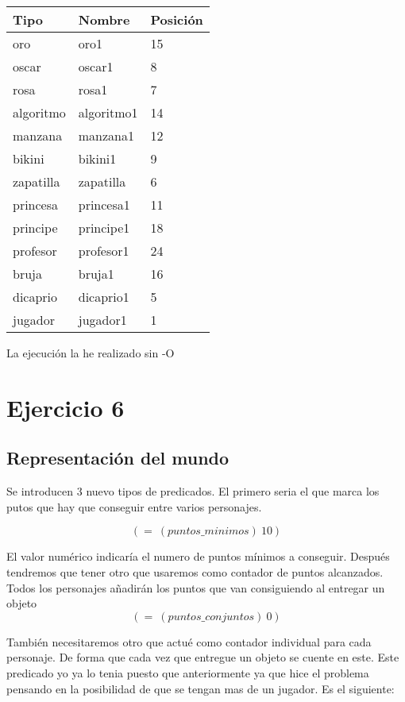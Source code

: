 \documentclass[]{article}
\begin{document}
\begin{table}[H]
	\begin{center}
		\begin{tabular}{|l|l|l|}
			\hline
			Tipo & Nombre & Posición \\
			\hline \hline
			oro & oro1 & 15 \\ \hline
			oscar & oscar1 & 8\\ \hline
			rosa & rosa1 & 7\\ \hline
			algoritmo & algoritmo1 & 14 \\ \hline
			manzana & manzana1 & 12\\ \hline
			bikini & bikini1 & 9\\ \hline
			zapatilla & zapatilla & 6\\ \hline 
			princesa & princesa1 & 11 \\ \hline
			principe & principe1 & 18 \\ \hline
			profesor & profesor1 & 24  \\ \hline
			bruja & bruja1 & 16 \\ \hline
			dicaprio  & dicaprio1& 5 \\ \hline
			jugador & jugador1 & 1 \\ \hline
			
		\end{tabular}
	\end{center}
\end{table}

La ejecución la he realizado sin -O
	\section{Ejercicio 6}
	\subsection{Representación del mundo}
	Se introducen 3 nuevo tipos de predicados. El primero seria el que marca los putos que hay que conseguir entre varios personajes.
	
	$$
	(=\ (puntos\_minimos)\ 10)
	$$
	
	El valor numérico indicaría el numero de puntos mínimos a conseguir.
	Después tendremos que tener otro que usaremos como contador de puntos alcanzados. Todos los personajes añadirán los puntos que van consiguiendo al entregar un objeto
	$$
	(=\ (puntos\_conjuntos)\ 0)
	$$
	
	También necesitaremos otro que actué como contador individual para cada personaje. De forma que cada vez que entregue un objeto se cuente en este. Este predicado yo ya lo tenia puesto que anteriormente ya que hice el problema pensando en la posibilidad de que se tengan mas de un jugador. Es el siguiente:
	
\end{document}
